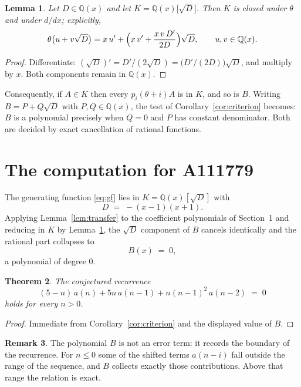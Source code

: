 \documentclass[11pt,a4paper]{article}
\theoremstyle{plain}
\newtheorem{theorem}{Theorem}
\newtheorem{lemma}[theorem]{Lemma}
\theoremstyle{definition}
\newtheorem{remark}[theorem]{Remark}
\begin{document}
\begin{lemma}\label{lem:field}
Let $D\in\mathbb{Q}(x)$ and let $K=\mathbb{Q}(x)\bigl[\sqrt{D}\bigr]$. Then $K$ is closed
under $\theta$ and under $d/dx$; explicitly,
\[
\theta\bigl(u+v\sqrt{D}\bigr)=x\,u'+\Bigl(x\,v'+\frac{x\,v\,D'}{2D}\Bigr)\sqrt{D},
\qquad u,v\in\mathbb{Q}(x).
\]
\end{lemma}

\begin{proof}
Differentiate: $(\sqrt{D})'=D'/(2\sqrt{D})=\bigl(D'/(2D)\bigr)\sqrt{D}$, and multiply by
$x$. Both components remain in $\mathbb{Q}(x)$.
\end{proof}

Consequently, if $A\in K$ then every $p_{i}(\theta+i)A$ is in $K$, and so is $B$. Writing
$B=P+Q\sqrt{D}$ with $P,Q\in\mathbb{Q}(x)$, the test of Corollary~\ref{cor:criterion}
becomes: $B$ is a polynomial precisely when $Q=0$ and $P$ has constant denominator. Both
are decided by exact cancellation of rational functions.

\section{The computation for A111779}

The generating function \eqref{eq:gf} lies in $K=\mathbb{Q}(x)[\sqrt{D}]$ with
\[
D \;=\; - \left(x - 1\right) \left(x + 1\right) .
\]
Applying Lemma~\ref{lem:transfer} to the coefficient polynomials of Section~1 and reducing
in $K$ by Lemma~\ref{lem:field}, the $\sqrt{D}$ component of $B$ cancels identically and
the rational part collapses to
\[
B(x)\;=\;0 ,
\]
a polynomial of degree $0$.

\begin{theorem}
The conjectured recurrence
\[
(5 - n)\,a(n) + 5 n\,a(n-1) + n \left(n - 1\right)^{2}\,a(n-2) \;=\;0
\]
holds for every $n>0$.
\end{theorem}

\begin{proof}
Immediate from Corollary~\ref{cor:criterion} and the displayed value of $B$.
\end{proof}

\begin{remark}
The polynomial $B$ is not an error term: it records the boundary of the recurrence. For
$n\le0$ some of the shifted terms $a(n-i)$ fall outside the range of the sequence,
and $B$ collects exactly those contributions. Above that range the relation is exact.
\end{remark}
\end{document}
